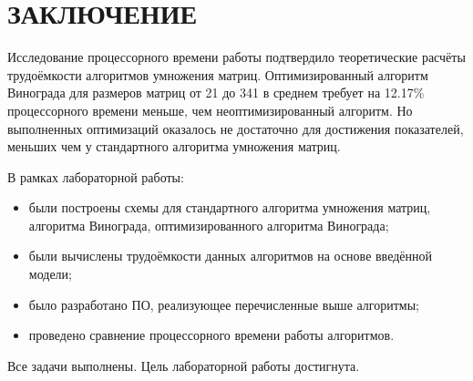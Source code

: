 \chapter*{ЗАКЛЮЧЕНИЕ}

Исследование процессорного времени работы подтвердило теоретические расчёты трудоёмкости алгоритмов умножения матриц. Оптимизированный алгоритм Винограда для размеров матриц от 21 до 341 в среднем требует на 12.17\% процессорного времени меньше, чем неоптимизированный алгоритм. Но выполненных оптимизаций оказалось не достаточно для достижения показателей, меньших чем у стандартного алгоритма умножения матриц.

В рамках лабораторной работы:

\begin{itemize}[label=--]
\item были построены схемы для стандартного алгоритма умножения матриц, алгоритма Винограда, оптимизированного алгоритма Винограда;
\item были вычислены трудоёмкости данных алгоритмов на основе введённой модели;
\item было разработано ПО, реализующее перечисленные выше алгоритмы;
\item проведено сравнение процессорного времени работы алгоритмов.
\end{itemize}

Все задачи выполнены. Цель лабораторной работы достигнута.